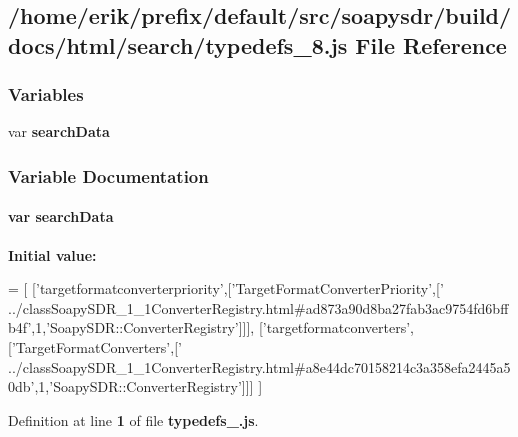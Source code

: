 \subsection{/home/erik/prefix/default/src/soapysdr/build/docs/html/search/typedefs\+\_\+8.js File Reference}
\label{typedefs__8_8js}
\subsubsection*{Variables}
\begin{DoxyCompactItemize}
\item 
var {\bf search\+Data}
\end{DoxyCompactItemize}


\subsubsection{Variable Documentation}
\paragraph[{search\+Data}]{\setlength{\rightskip}{0pt plus 5cm}var search\+Data}\label{typedefs__8_8js_ad01a7523f103d6242ef9b0451861231e}
{\bfseries Initial value\+:}
\begin{DoxyCode}
=
[
  [\textcolor{stringliteral}{'targetformatconverterpriority'},[\textcolor{stringliteral}{'TargetFormatConverterPriority'},[\textcolor{stringliteral}{'
      ../classSoapySDR\_1\_1ConverterRegistry.html#ad873a90d8ba27fab3ac9754fd6bffb4f'},1,\textcolor{stringliteral}{'SoapySDR::ConverterRegistry'}]]],
  [\textcolor{stringliteral}{'targetformatconverters'},[\textcolor{stringliteral}{'TargetFormatConverters'},[\textcolor{stringliteral}{'
      ../classSoapySDR\_1\_1ConverterRegistry.html#a8e44dc70158214c3a358efa2445a50db'},1,\textcolor{stringliteral}{'SoapySDR::ConverterRegistry'}]]]
]
\end{DoxyCode}


Definition at line {\bf 1} of file {\bf typedefs\+\_.\+js}.

